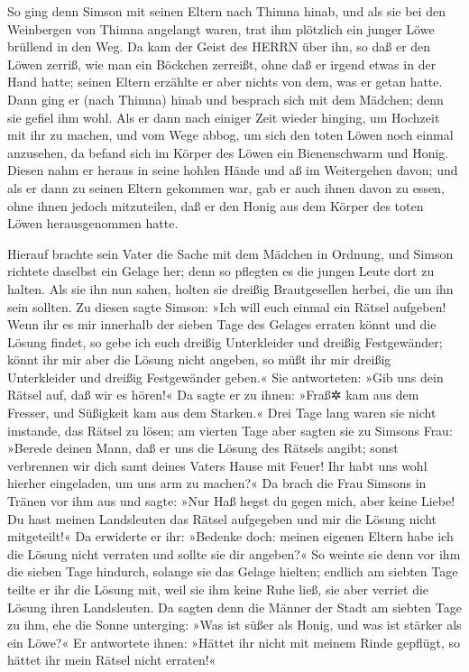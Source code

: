So ging denn Simson mit seinen Eltern nach Thimna hinab,
und als sie bei den Weinbergen von Thimna angelangt waren, trat ihm
plötzlich ein junger Löwe brüllend in den Weg. Da kam der
Geist des HERRN über ihn, so daß er den Löwen zerriß, wie man ein
Böckchen zerreißt, ohne daß er irgend etwas in der Hand hatte; seinen
Eltern erzählte er aber nichts von dem, was er getan hatte.
Dann ging er (nach Thimna) hinab und besprach sich mit dem
Mädchen; denn sie gefiel ihm wohl. Als er dann nach
einiger Zeit wieder hinging, um Hochzeit mit ihr zu machen, und vom Wege
abbog, um sich den toten Löwen noch einmal anzusehen, da befand sich im
Körper des Löwen ein Bienenschwarm und Honig. Diesen nahm
er heraus in seine hohlen Hände und aß im Weitergehen davon; und als er
dann zu seinen Eltern gekommen war, gab er auch ihnen davon zu essen,
ohne ihnen jedoch mitzuteilen, daß er den Honig aus dem Körper des toten
Löwen herausgenommen hatte.

Hierauf brachte sein Vater die Sache mit dem Mädchen in
Ordnung, und Simson richtete daselbst ein Gelage her; denn so pflegten
es die jungen Leute dort zu halten. Als sie ihn nun
sahen, holten sie dreißig Brautgesellen herbei, die um ihn sein sollten.
Zu diesen sagte Simson: »Ich will euch einmal ein Rätsel
aufgeben! Wenn ihr es mir innerhalb der sieben Tage des Gelages erraten
könnt und die Lösung findet, so gebe ich euch dreißig Unterkleider und
dreißig Festgewänder; könnt ihr mir aber die Lösung nicht
angeben, so müßt ihr mir dreißig Unterkleider und dreißig Festgewänder
geben.« Sie antworteten: »Gib uns dein Rätsel auf, daß wir es hören!«
Da sagte er zu ihnen: »Fraß✲ kam aus dem Fresser, und
Süßigkeit kam aus dem Starken.« Drei Tage lang waren sie nicht imstande,
das Rätsel zu lösen; am vierten Tage aber sagten sie zu
Simsons Frau: »Berede deinen Mann, daß er uns die Lösung des Rätsels
angibt; sonst verbrennen wir dich samt deines Vaters Hause mit Feuer!
Ihr habt uns wohl hierher eingeladen, um uns arm zu machen?«
Da brach die Frau Simsons in Tränen vor ihm aus und
sagte: »Nur Haß hegst du gegen mich, aber keine Liebe! Du hast meinen
Landsleuten das Rätsel aufgegeben und mir die Lösung nicht mitgeteilt!«
Da erwiderte er ihr: »Bedenke doch: meinen eigenen Eltern habe ich die
Lösung nicht verraten und sollte sie dir angeben?« So
weinte sie denn vor ihm die sieben Tage hindurch, solange sie das Gelage
hielten; endlich am siebten Tage teilte er ihr die Lösung mit, weil sie
ihm keine Ruhe ließ, sie aber verriet die Lösung ihren Landsleuten.
Da sagten denn die Männer der Stadt am siebten Tage zu
ihm, ehe die Sonne unterging: »Was ist süßer als Honig, und was ist
stärker als ein Löwe?« Er antwortete ihnen: »Hättet ihr nicht mit meinem
Rinde gepflügt, so hättet ihr mein Rätsel nicht erraten!«

